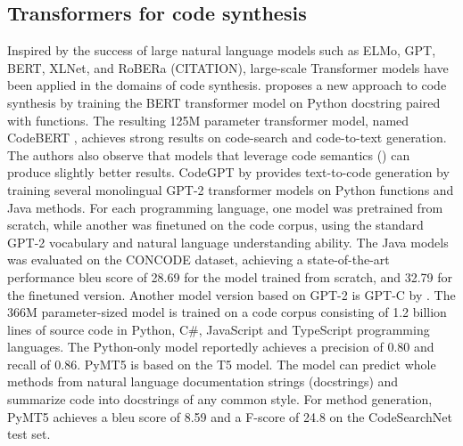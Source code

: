 \subsection{Transformers for code synthesis}
Inspired by the success of large natural language models such as ELMo, GPT, BERT, XLNet, and RoBERa (CITATION), large-scale Transformer models have been applied in the domains of code synthesis. \textcite{feng2020codebert} proposes a new approach to code synthesis by training the BERT transformer model on Python \gls{docstring} paired with functions. The resulting 125M parameter transformer model, named CodeBERT \cite{feng2020codebert}, achieves strong results on code-search and code-to-text generation. The authors also observe that models that leverage code semantics () can produce slightly better results. CodeGPT by \cite{lu2021codexglue} provides text-to-code generation by training several monolingual GPT-2 transformer models on Python functions and Java methods. For each programming language, one model was pretrained from scratch, while another was finetuned on the code corpus, using the standard GPT-2 vocabulary and natural language understanding ability. The Java models was evaluated on the CONCODE  dataset, achieving a state-of-the-art performance \acrshort{bleu} score \cite{papineni2002bleu} of 28.69 for the model trained from scratch, and 32.79 for the finetuned version. Another model version based on GPT-2 is GPT-C by \textcite{svyatkovskiy2020intellicode}. The 366M parameter-sized model is trained on a code corpus consisting of 1.2 billion lines of source code in Python, C\#, JavaScript and TypeScript programming languages. The Python-only model reportedly achieves a  precision of 0.80 and recall of 0.86. PyMT5 \textcite{colin2020pymt5} is based on the T5 model. The model can predict whole methods from natural language documentation strings (docstrings) and summarize code into docstrings of any common style. For method generation, PyMT5 achieves a \gls{bleu} score of 8.59 and a  F-score of 24.8 on the CodeSearchNet  test set.

